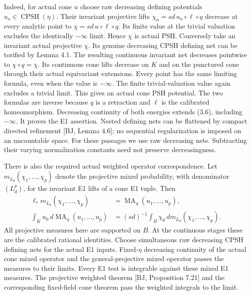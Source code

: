 \documentclass[
  10pt,
]{article}
\begin{document}
Indeed, for actual cone \(u\) choose raw decreasing defining potentials
\(u_a\in\operatorname{CPSH}(\eta)\). Their invariant projective lifts
\(\chi_a=sd\,u_a\circ\ell\circ q\) decrease at every analytic point to
\(\chi=sd\,u\circ\ell\circ q\). Its finite value at the trivial
valuation excludes the identically \(-\infty\) limit. Hence \(\chi\) is
actual PSH. Conversely take an invariant actual projective \(\chi\). Its
genuine decreasing CPSH defining net can be torified by Lemma 4.1. The
resulting continuous invariant net decreases pointwise to
\(\chi\circ q=\chi\). Its continuous cone lifts decrease on \(K\) and on
the punctured cone through their actual equivariant extensions. Every
point has the same limiting formula, even when the value is \(-\infty\).
The finite trivial-valuation value again excludes a trivial limit. This
gives an actual cone PSH potential. The two formulas are inverse because
\(q\) is a retraction and \(\ell\) is the calibrated homeomorphism.
Decreasing continuity of both energies extends (3.6), including
\(-\infty\). It proves the E1 assertion. Nested defining nets can be
flattened by compact directed refinement {[}BJ, Lemma 4.6{]}; no
sequential regularization is imposed on an uncountable space. For these
passages we use raw decreasing nets. Subtracting their varying
normalization constants need not preserve decreasingness.

There is also the required actual weighted operator correspondence. Let
\(m_{L_d}(\chi_1,\ldots,\chi_p)\) denote the projective mixed
probability, with denominator \((L_d^p)\), for the invariant E1 lifts of
a cone E1 tuple. Then \[
 \begin{split}
 \ell_*m_{L_d}(\chi_1,\ldots,\chi_p)
     &=\operatorname{MA}_\eta(u_1,\ldots,u_p),\\
 \int_Ku_0\,d\operatorname{MA}_\eta(u_1,\ldots,u_p)
     &=(sd)^{-1}\int_B\chi_0\,dm_{L_d}(\chi_1,\ldots,\chi_p).
 \end{split}                                                   \tag{4.2}
\] All projective measures here are supported on \(B\). At the
continuous stages these are the calibrated rational identities. Choose
simultaneous raw decreasing CPSH defining nets for the actual E1 inputs.
Fixed-\(\eta\) decreasing continuity of the actual cone mixed operator
and the general-projective mixed operator passes the measures to their
limits. Every E1 test is integrable against these mixed E1 measures. The
projective weighted theorem {[}BJ, Proposition 7.21{]} and the
corresponding fixed-field cone theorem pass the weighted integrals to
the limit.
\end{document}
